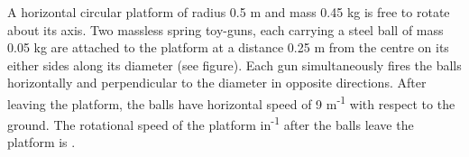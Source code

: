 
    \item A horizontal circular platform of radius 0.5 m and mass 0.45 kg is free to rotate about its axis. Two massless spring toy-guns, each carrying a steel ball of mass 0.05 kg are attached to the platform at a distance 0.25 m from the centre on its either sides along its diameter (see figure). Each gun simultaneously fires the balls horizontally and perpendicular to the diameter in opposite directions. After leaving the platform, the balls have horizontal speed of 9 m\textsuperscript{-1} with respect to the ground. The rotational speed of the platform in\textsuperscript{-1} after the balls leave the platform is \underline{\hspace{2.5 cm}}.

    \begin{center}
    \end{center}

